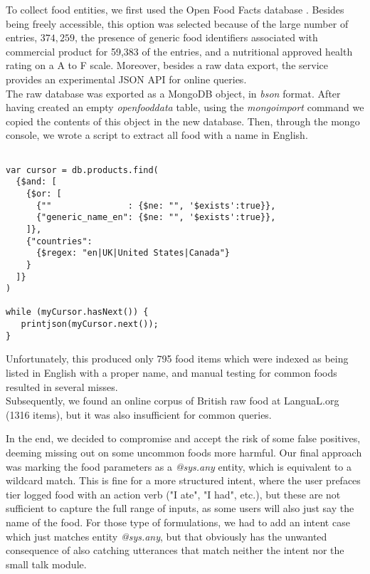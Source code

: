 To collect food entities, we first used the Open Food Facts database \cite{openfoodfacts}. Besides being freely accessible, this option was selected because of the large number of entries, $374,259$, the presence of generic food identifiers associated with commercial product for 59,383 of the entries, and a nutritional approved health rating on a A to F scale. Moreover, besides a raw data export, the service provides an experimental JSON API for online queries. \\
The raw database was exported as a MongoDB \cite{mongo} object, in \textit{bson} format. After having created an empty \textit{openfooddata} table, using the \textit{mongoimport} command we copied the contents of this object in the new database. Then, through the mongo console, we wrote a script to extract all food with a name in English.
\begin{lstlisting}[upquote=true]

var cursor = db.products.find(
  {$and: [
    {$or: [
      {""               : {$ne: "", '$exists':true}},
      {"generic_name_en": {$ne: "", '$exists':true}},
    ]}, 
    {"countries":
      {$regex: "en|UK|United States|Canada"}
    }
  ]}
)

while (myCursor.hasNext()) {
   printjson(myCursor.next());
}
\end{lstlisting}

Unfortunately, this produced only 795 food items which were indexed as being listed in English with a proper name, and manual testing for common foods resulted in several misses.\\
Subsequently, we found an online corpus of British raw food at LanguaL.org \cite{langual} (1316 items), but it was also insufficient for common queries. 

In the end, we decided to compromise and accept the risk of some false positives, deeming missing out on some uncommon foods more harmful. Our final approach was marking the food parameters as a \textit{@sys.any} entity, which is equivalent to a wildcard match. This is fine for a more structured intent, where the user prefaces tier logged food with an action verb ("I ate", "I had", etc.), but these are not sufficient to capture the full range of inputs, as some users will also just say the name of the food. For those type of formulations, we had to add an intent case which just matches entity \textit{@sys.any}, but that obviously has the unwanted consequence of also catching utterances that match neither the intent nor the small talk module.
